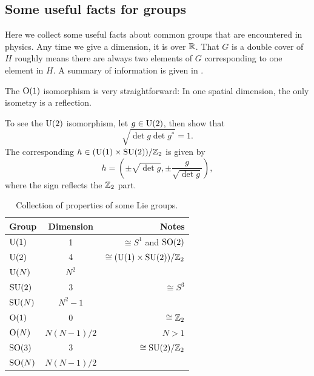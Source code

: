 \subsection{Some useful facts for groups}

Here we collect some useful facts about common groups that are encountered
in physics. Any time we give a dimension, it is over $\mathbb{R}$. 
That $G$ is a double cover of $H$ roughly means there are always two 
elements of $G$ corresponding to one element in
$H$. A summary of information is given in .

The $\operatorname{\text{O}}(1)$ isomorphism is very straightforward: In one spatial dimension, the
only isometry is a reflection.

To see the $\operatorname{U}(2)$ isomorphism, let $g\in\operatorname{U}(2)$, then show that
\begin{equation}
\sqrt{\det g\det g^*}=1.
\end{equation} 
The corresponding
$h\in (\operatorname{U}(1)\times \operatorname{SU}(2))/\mathbb{Z}_2$ is given by
\begin{equation}
h=\left(\pm\sqrt{\det g},\pm\frac{g}{\sqrt{\det g}}\right),
\end{equation} 
where the sign reflects the $\mathbb{Z}_2$ part.

\begin{table}
\centering
\caption{Collection of properties of some Lie groups.}
\begin{tabularx}{\linewidth}{lCr}
\hline\hline
Group & Dimension & Notes\\
\hline
$\operatorname{U}(1)$  & 1          & $\cong S^1$ and $\operatorname{SO}(2)$\\
$\operatorname{U}(2)$  & 4          & $\cong (\operatorname{U}(1)\times \operatorname{SU}(2))/\mathbb{Z}_2$\\
$\operatorname{U}(N)$  & $N^2$      & \\ 
$\operatorname{SU}(2)$ & 3          & $\cong S^3$\\ 
$\operatorname{SU}(N)$ & $N^2-1$    & \\
$\operatorname{\text{O}}(1)$ & 0          & $\cong\mathbb{Z}_2$\\
$\operatorname{\text{O}}(N)$ & $N(N-1)/2$ & $N>1$\\
$\operatorname{SO}(3)$ & 3          & $\cong\operatorname{SU}(2)/\mathbb{Z}_2$\\
$\operatorname{SO}(N)$ & $N(N-1)/2$ & \\
\hline\hline
\end{tabularx}
\label{tab:lie}
\end{table}




 
